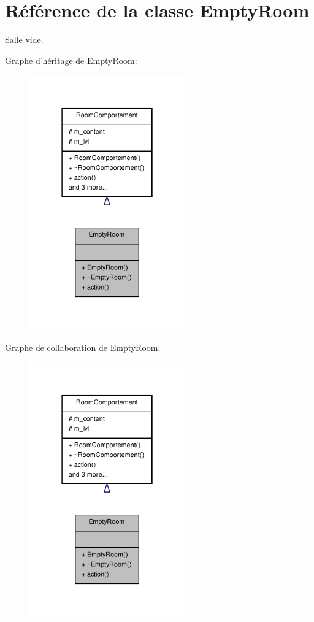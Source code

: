 \hypertarget{class_empty_room}{\section{Référence de la classe Empty\-Room}
\label{class_empty_room}
}


Salle vide.  




Graphe d'héritage de Empty\-Room\-:
\nopagebreak
\begin{figure}[H]
\begin{center}
\leavevmode
\includegraphics[width=190pt]{class_empty_room__inherit__graph}
\end{center}
\end{figure}


Graphe de collaboration de Empty\-Room\-:
\nopagebreak
\begin{figure}[H]
\begin{center}
\leavevmode
\includegraphics[width=190pt]{class_empty_room__coll__graph}
\end{center}
\end{figure}
